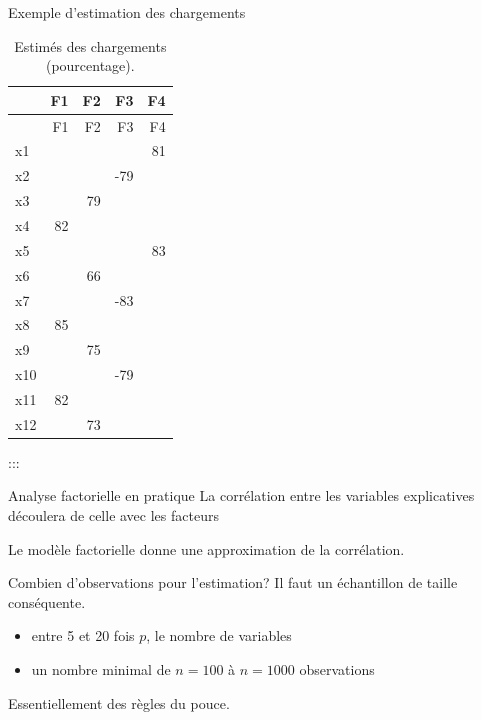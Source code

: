\documentclass[
  ignorenonframetext,
]{beamer}
\providecommand{\tightlist}{%
  \setlength{\itemsep}{0pt}\setlength{\parskip}{0pt}}\usepackage{longtable,booktabs,array}
\begin{document}
\begin{frame}{Exemple d'estimation des chargements}
\protect\hypertarget{exemple-destimation-des-chargements}{}
\hypertarget{tbl-factocp}{}
\begin{longtable}[]{@{}lrrrr@{}}
\caption{\label{tbl-factocp}Estimés des chargements
(pourcentage).}\tabularnewline
\toprule()
& F1 & F2 & F3 & F4 \\
\midrule()
\endfirsthead
\toprule()
& F1 & F2 & F3 & F4 \\
\midrule()
\endhead
x1 & & & & 81 \\
x2 & & & -79 & \\
x3 & & 79 & & \\
x4 & 82 & & & \\
x5 & & & & 83 \\
x6 & & 66 & & \\
x7 & & & -83 & \\
x8 & 85 & & & \\
x9 & & 75 & & \\
x10 & & & -79 & \\
x11 & 82 & & & \\
x12 & & 73 & & \\
\bottomrule()
\end{longtable}

:::
\end{frame}

\begin{frame}{Analyse factorielle en pratique}
\protect\hypertarget{analyse-factorielle-en-pratique}{}
La corrélation entre les variables explicatives découlera de celle avec
les facteurs

Le modèle factorielle donne une approximation de la corrélation.
\end{frame}

\begin{frame}{Combien d'observations pour l'estimation?}
\protect\hypertarget{combien-dobservations-pour-lestimation}{}
Il faut un échantillon de taille conséquente.

\begin{itemize}
\tightlist
\item
  entre 5 et 20 fois \(p\), le nombre de variables
\item
  un nombre minimal de \(n=100\) à \(n=1000\) observations
\end{itemize}

Essentiellement des règles du pouce.
\end{frame}
\end{document}
